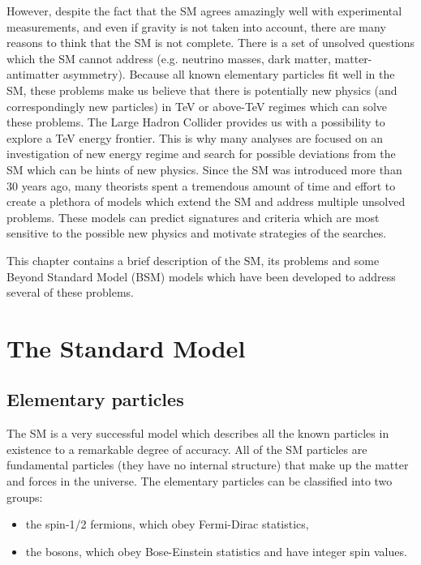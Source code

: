 However, despite the fact that the SM agrees amazingly well with experimental measurements, and even if gravity is not taken into account, 
there are many reasons to think that the SM is not complete.
There is a set of unsolved questions which the SM cannot address (e.g. neutrino masses, dark matter, matter-antimatter asymmetry).
Because all known elementary particles fit well in the SM, these problems make us believe that there is
potentially new physics (and correspondingly new particles) in TeV or above-TeV regimes which can solve these problems.
The Large Hadron Collider provides us with a possibility to explore a TeV energy frontier.
This is why many analyses are focused on an investigation of new energy regime and search for possible deviations from the SM which can be hints of new physics.
Since the SM was introduced more than 30 years ago, many theorists spent a tremendous amount of time and effort to create
a plethora of models which extend the SM and address multiple unsolved problems. These models can predict signatures and criteria which are most sensitive to the possible new physics and motivate strategies of the searches.

This chapter contains a brief description of the SM, its problems and 
some Beyond Standard Model (BSM) models which have been developed to address several of these problems.

\section{The Standard Model}

\subsection{Elementary particles}



The SM is a very successful model which describes all the known particles in existence to a remarkable degree of accuracy.
All of the SM particles are fundamental particles (they have no internal structure) that make up the matter and forces in the universe.
The elementary particles can be classified into two groups: 
\begin{itemize}
 \item the spin-1/2 fermions, which obey Fermi-Dirac statistics,
 \item the bosons, which obey Bose-Einstein statistics and have integer spin values.
\end{itemize}

